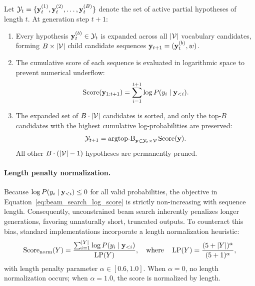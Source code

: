 \documentclass[../../main.tex]{subfiles}
\begin{document}
Let $\mathcal{Y}_t = \{\mathbf{y}_t^{(1)}, \mathbf{y}_t^{(2)}, \dots, \mathbf{y}_t^{(B)}\}$ denote the set of active partial hypotheses of length $t$. At generation step $t+1$:
\begin{enumerate}
    \item Every hypothesis $\mathbf{y}_t^{(b)} \in \mathcal{Y}_t$ is expanded across all $|\mathcal{V}|$ vocabulary candidates, forming $B \times |\mathcal{V}|$ child candidate sequences $\mathbf{y}_{t+1} = (\mathbf{y}_t^{(b)}, w)$.
    \item The cumulative score of each sequence is evaluated in logarithmic space to prevent numerical underflow:
    \begin{equation}
    \label{eq:beam_search_log_score}
    \text{Score}(\mathbf{y}_{1:t+1}) = \sum_{i=1}^{t+1} \log P(y_i \mid \mathbf{y}_{<i}).
    \end{equation}
    \item The expanded set of $B \cdot |\mathcal{V}|$ candidates is sorted, and only the top-$B$ candidates with the highest cumulative log-probabilities are preserved:
    \begin{equation}
    \label{eq:beam_search_prune}
    \mathcal{Y}_{t+1} = \operatorname{argtop-B}_{\mathbf{y} \in \mathcal{Y}_t \times \mathcal{V}} \text{Score}(\mathbf{y}).
    \end{equation}
    All other $B \cdot (|\mathcal{V}|-1)$ hypotheses are permanently pruned.
\end{enumerate}

\paragraph{Length penalty normalization.}
Because $\log P(y_i \mid \mathbf{y}_{<i}) \le 0$ for all valid probabilities, the objective in Equation~\eqref{eq:beam_search_log_score} is strictly non-increasing with sequence length. Consequently, unconstrained beam search inherently penalizes longer generations, favoring unnaturally short, truncated outputs. To counteract this bias, standard implementations incorporate a length normalization heuristic:
\begin{equation}
\label{eq:beam_length_penalty}
\text{Score}_{\text{norm}}(Y) = \frac{\sum_{i=1}^{|Y|} \log P(y_i \mid \mathbf{y}_{<i})}{\operatorname{LP}(Y)}, \quad \text{where} \quad \operatorname{LP}(Y) = \frac{(5 + |Y|)^\alpha}{(5 + 1)^\alpha},
\end{equation}
with length penalty parameter $\alpha \in [0.6, 1.0]$. When $\alpha = 0$, no length normalization occurs; when $\alpha = 1.0$, the score is normalized by length.
\end{document}
